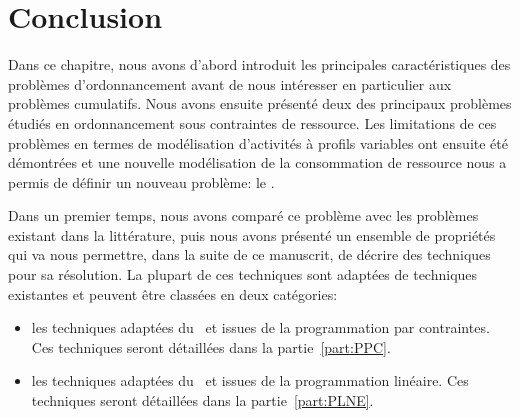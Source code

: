 
\section{Conclusion}

Dans ce chapitre, nous avons d'abord introduit les principales
caractéristiques des problèmes d'ordonnancement avant de nous intéresser
en particulier aux problèmes cumulatifs. Nous avons ensuite présenté
deux des principaux problèmes étudiés en ordonnancement sous
contraintes de ressource. Les limitations de ces problèmes en termes de
modélisation d'activités à profils variables ont ensuite
été démontrées et une nouvelle modélisation de la consommation de
ressource nous a permis de définir un nouveau problème: le
\CECSP. 

Dans un premier temps, nous avons comparé ce problème avec les
problèmes existant dans la littérature, puis nous avons présenté un
ensemble de propriétés qui va nous permettre, dans la suite de ce
manuscrit, de décrire des techniques pour sa résolution. La plupart de
ces techniques sont adaptées de techniques existantes et peuvent être
classées en deux catégories: 
\begin{itemize}
\item les techniques adaptées du \CUSP~et issues de la programmation
par contraintes. Ces techniques seront détaillées dans la
partie~\ref{part:PPC}.
\item les techniques adaptées du \RCPSP~et issues de la programmation
linéaire. Ces techniques seront détaillées dans la
partie~\ref{part:PLNE}.
\end{itemize}